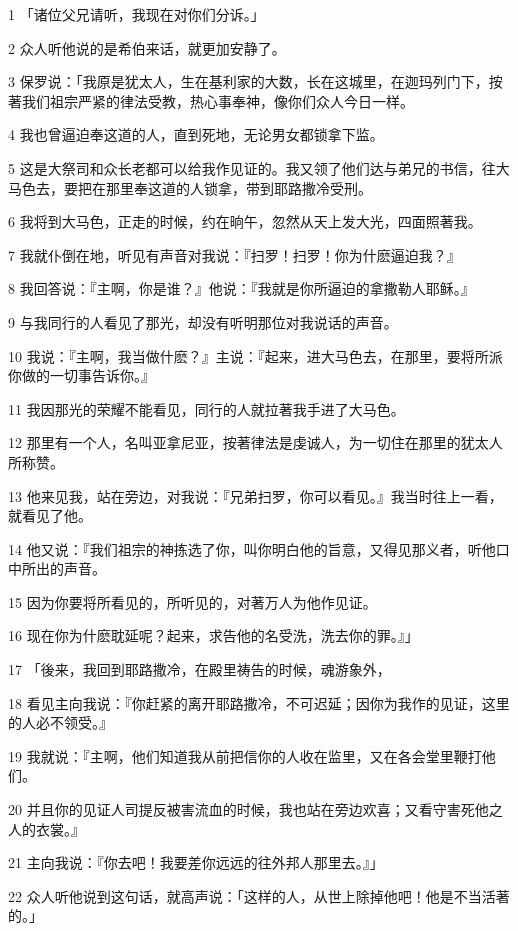 \par 1 「诸位父兄请听，我现在对你们分诉。」
\par 2 众人听他说的是希伯来话，就更加安静了。
\par 3 保罗说：「我原是犹太人，生在基利家的大数，长在这城里，在迦玛列门下，按著我们祖宗严紧的律法受教，热心事奉神，像你们众人今日一样。
\par 4 我也曾逼迫奉这道的人，直到死地，无论男女都锁拿下监。
\par 5 这是大祭司和众长老都可以给我作见证的。我又领了他们达与弟兄的书信，往大马色去，要把在那里奉这道的人锁拿，带到耶路撒冷受刑。
\par 6 我将到大马色，正走的时候，约在晌午，忽然从天上发大光，四面照著我。
\par 7 我就仆倒在地，听见有声音对我说：『扫罗！扫罗！你为什麽逼迫我？』
\par 8 我回答说：『主啊，你是谁？』他说：『我就是你所逼迫的拿撒勒人耶稣。』
\par 9 与我同行的人看见了那光，却没有听明那位对我说话的声音。
\par 10 我说：『主啊，我当做什麽？』主说：『起来，进大马色去，在那里，要将所派你做的一切事告诉你。』
\par 11 我因那光的荣耀不能看见，同行的人就拉著我手进了大马色。
\par 12 那里有一个人，名叫亚拿尼亚，按著律法是虔诚人，为一切住在那里的犹太人所称赞。
\par 13 他来见我，站在旁边，对我说：『兄弟扫罗，你可以看见。』我当时往上一看，就看见了他。
\par 14 他又说：『我们祖宗的神拣选了你，叫你明白他的旨意，又得见那义者，听他口中所出的声音。
\par 15 因为你要将所看见的，所听见的，对著万人为他作见证。
\par 16 现在你为什麽耽延呢？起来，求告他的名受洗，洗去你的罪。』」
\par 17 「後来，我回到耶路撒冷，在殿里祷告的时候，魂游象外，
\par 18 看见主向我说：『你赶紧的离开耶路撒冷，不可迟延；因你为我作的见证，这里的人必不领受。』
\par 19 我就说：『主啊，他们知道我从前把信你的人收在监里，又在各会堂里鞭打他们。
\par 20 并且你的见证人司提反被害流血的时候，我也站在旁边欢喜；又看守害死他之人的衣裳。』
\par 21 主向我说：『你去吧！我要差你远远的往外邦人那里去。』」
\par 22 众人听他说到这句话，就高声说：「这样的人，从世上除掉他吧！他是不当活著的。」
